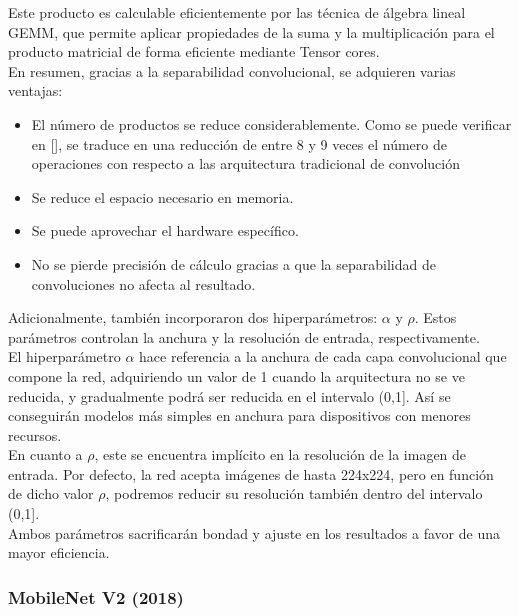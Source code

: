 Este producto es calculable eficientemente por las técnica de álgebra lineal GEMM, que permite aplicar propiedades de la suma y la multiplicación para el producto matricial de forma eficiente mediante Tensor cores.\\

En resumen, gracias a la separabilidad convolucional, se adquieren varias ventajas:
\begin{itemize}
    \item El número de productos se reduce considerablemente. Como se puede verificar en [], se traduce en una reducción de entre 8 y 9 veces el número de operaciones con respecto a las arquitectura tradicional de convolución
    \item Se reduce el espacio necesario en memoria.
    \item Se puede aprovechar el hardware específico.
    \item No se pierde precisión de cálculo gracias a que la separabilidad de convoluciones no afecta al resultado.
\end{itemize}

Adicionalmente, también incorporaron dos hiperparámetros: $\alpha$ y $\rho$. Estos parámetros controlan la anchura y la resolución de entrada, respectivamente.\\
El hiperparámetro $\alpha$ hace referencia a la anchura de cada capa convolucional que compone la red, adquiriendo un valor de 1 cuando la arquitectura no se ve reducida, y gradualmente podrá ser reducida en el intervalo (0,1]. Así se conseguirán modelos más simples en anchura para dispositivos con menores recursos.\\

En cuanto a $\rho$, este se encuentra implícito en la resolución de la imagen de entrada. Por defecto, la red acepta imágenes de hasta 224x224, pero en función de dicho valor $\rho$, podremos reducir su resolución también dentro del intervalo (0,1].\\

Ambos parámetros sacrificarán bondad y ajuste en los resultados a favor de una mayor eficiencia.

\subsubsection{MobileNet V2 (2018)}

